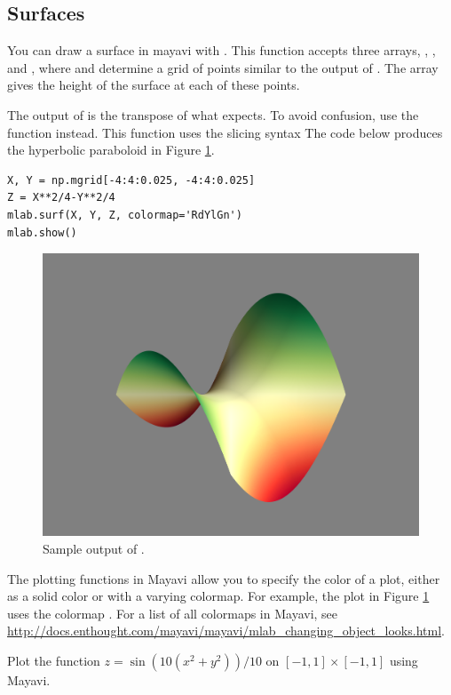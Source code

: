 \subsection*{Surfaces}
You can draw a surface in mayavi with .
This function accepts three arrays, , , and , where  and  determine a grid of points similar to the output of .
The array  gives the height of the surface at each of these points.

The output of  is the transpose of what  expects.
To avoid confusion, use the function  instead.
This function uses the slicing syntax 
The code below produces the hyperbolic paraboloid in Figure \ref{fig:surf_example}.

\begin{lstlisting}
X, Y = np.mgrid[-4:4:0.025, -4:4:0.025]
Z = X**2/4-Y**2/4
mlab.surf(X, Y, Z, colormap='RdYlGn')
mlab.show()
\end{lstlisting}


\begin{figure}
\includegraphics[width=.7\textwidth]{mesh_example.png}
\caption{Sample output of .}
\label{fig:surf_example}
\end{figure}

The plotting functions in Mayavi allow you to specify the color of a plot, either as a solid color or with a varying colormap.
For example, the plot in Figure \ref{fig:surf_example} uses the colormap .
For a list of all colormaps in Mayavi, see \url{http://docs.enthought.com/mayavi/mayavi/mlab_changing_object_looks.html}.

\begin{problem}
Plot the function $z = \sin(10(x^2+y^2))/10$ on $[-1,1] \times [-1,1]$ using Mayavi.
\end{problem}


